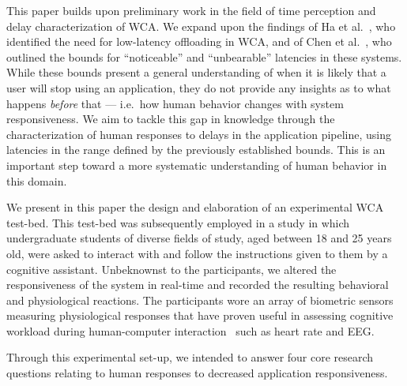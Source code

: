 This paper builds upon preliminary work in the field of time perception and delay characterization of WCA.\@
We expand upon the findings of Ha et al.~\cite{Ha:TowardsWearableCogAssist}, who identified the need for low-latency offloading in WCA, and of Chen et al.~\cite{Chen:AnEmpiricalStudyOfLatency}, who outlined the bounds for ``noticeable'' and ``unbearable'' latencies in these systems.
While these bounds present a general understanding of when it is likely that a user will stop using an application, they do not provide any insights as to what happens \emph{before} that --- i.e.\ how human behavior changes with system responsiveness.
We aim to tackle this gap in knowledge through the characterization of human responses to delays in the application pipeline, using latencies in the range defined by the previously established bounds.
This is an important step toward a more systematic understanding of human behavior in this domain.

We present in this paper the design and elaboration of an experimental WCA test-bed.
This test-bed was subsequently employed in a study in which undergraduate students of diverse fields of study, aged between 18 and 25 years old, were asked to interact with and follow the instructions given to them by a cognitive assistant.
Unbeknownst to the participants, we altered the responsiveness of the system in real-time and recorded the resulting behavioral and physiological reactions. 
The participants wore an array of biometric sensors measuring physiological responses that have proven useful in assessing cognitive workload during human-computer interaction~\cite{haapalainen2010psycho,kumar2016measurement} such as heart rate and EEG.\@

Through this experimental set-up, we intended to answer four core research questions relating to human responses to decreased application responsiveness.

